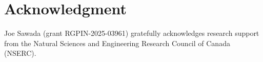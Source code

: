 \documentclass[US-letter,USenglish,authorcolumns,autoref]{lipics-v2021}
\begin{document}

\section{Acknowledgment}
Joe Sawada (grant RGPIN-2025-03961) gratefully acknowledges research support from the Natural Sciences and Engineering Research Council of Canada (NSERC).
\end{document}
